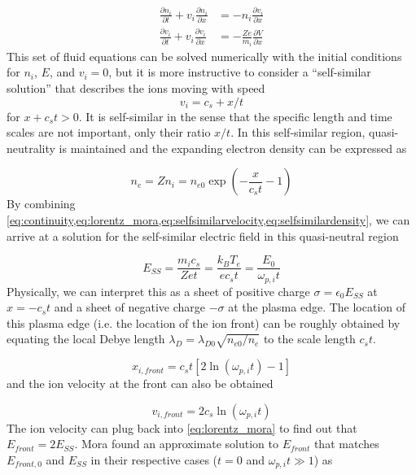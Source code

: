\begin{subequations}
	\begin{align}
		\frac{\partial n_i}{\partial t} + v_i \frac{\partial n_i}{\partial x} &= - n_i \frac{\partial v_i}{\partial x} \label{eq:continuity} \\
		\frac{\partial v_i}{\partial t} + v_i \frac{\partial v_i}{\partial x} &= -\frac{Z e}{m_i} \frac{\partial V}{\partial x} \label{eq:lorentz_mora}
	\end{align}
\end{subequations}
This set of fluid equations can be solved numerically with the initial conditions for $n_i$, $E$, and $v_i = 0$, but it is more instructive to consider a ``self-similar solution'' that describes the ions moving with speed 
\begin{equation}
	v_i = c_s + x/t \label{eq:selfsimilarvelocity}
\end{equation}
for $x + c_s t > 0$. It is self-similar in the sense that the specific length and time scales are not important, only their ratio $x/t$. In this self-similar region, quasi-neutrality is maintained and the expanding electron density can be expressed as

\begin{equation}
	n_e = Z n_i = n_{e 0} \exp(-\frac{x}{c_s t} - 1) \label{eq:selfsimilardensity}
\end{equation} 
By combining \cref{eq:continuity,eq:lorentz_mora,eq:selfsimilarvelocity,eq:selfsimilardensity}, we can arrive at a solution for the self-similar electric field in this quasi-neutral region

\begin{equation}
	E_{SS} = \frac{m_i c_s}{Z e t} = \frac{k_B T_e}{e c_s t} = \frac{E_0}{\omega_{p,i} t} \label{eq:selfsimilarefield}
\end{equation}
Physically, we can interpret this as a sheet of positive charge $\sigma = \epsilon_0 E_{SS}$ at $x = - c_s t$ and a sheet of negative charge $-\sigma$ at the plasma edge. The location of this plasma edge (i.e. the location of the ion front) can be roughly obtained by equating the local Debye length $\lambda_D = \lambda_{D0} \sqrt{n_{e0}/n_e}$ to the scale length $c_s t$.

\begin{equation}
	x_{i, front} = c_s t [2 \ln(\omega_{p,i} t) - 1] \label{eq:mora_xfront}
\end{equation} 
and the ion velocity at the front can also be obtained 

\begin{equation}
	v_{i, front} = 2 c_s \ln(\omega_{p,i} t)
\end{equation}
The ion velocity can plug back into \cref{eq:lorentz_mora} to find out that $E_{front} = 2 E_{SS}$. Mora found an approximate solution to $E_{front}$ that matches $E_{front,0}$ and $E_{SS}$ in their respective cases ($t = 0$ and $\omega_{p,i} t \gg 1$) as 

